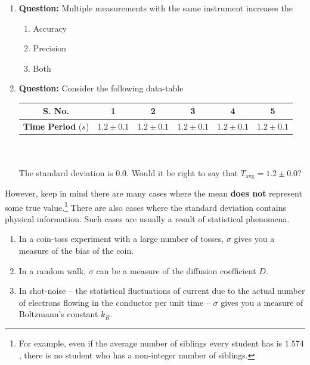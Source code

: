 \begin{question}
\begin{enumerate}
    \item \textbf{Question:} Multiple measurements with the same instrument increases the
    \begin{enumerate}
        \item Accuracy
        \item Precision
        \item Both
    \end{enumerate}
    
    \item \textbf{Question:} Consider the following data-table~\\
    \begin{tabular}{cccccc}
    \hline
    \textbf{S. No.}&1&2&3&4&5\\
    \hline
    \textbf{Time Period} ($s$)& $1.2\pm0.1$&$1.2\pm0.1$&$1.2\pm0.1$&$1.2\pm0.1$&$1.2\pm0.1$\\
    \hline
    \end{tabular}~\\~\\
    The standard deviation is $0.0$. Would it be right to say that $T_\text{avg} = 1.2\pm 0.0$?
\end{enumerate}
\end{question}

However, keep in mind there are many cases where the mean  \textbf{does not} represent some true value.\footnote{For example, even if the average number of siblings every student has is $1.574$, there is no student who has a non-integer number of siblings.} There are also cases where the standard deviation contains physical information. Such cases are usually a result of statistical phenomena.

\begin{tip}
\begin{enumerate}
    \item In a coin-toss experiment with a large number of tosses, $\sigma$ gives you a measure of the bias of the coin.
    \item In a random walk, $\sigma$ can be a measure of the diffusion coefficient $D$.
    \item In shot-noise -- the statistical fluctuations of current due to the actual number of electrons flowing in the conductor per unit time -- $\sigma$ gives you a measure of Boltzmann's constant $k_B$.
\end{enumerate}
\end{tip}



